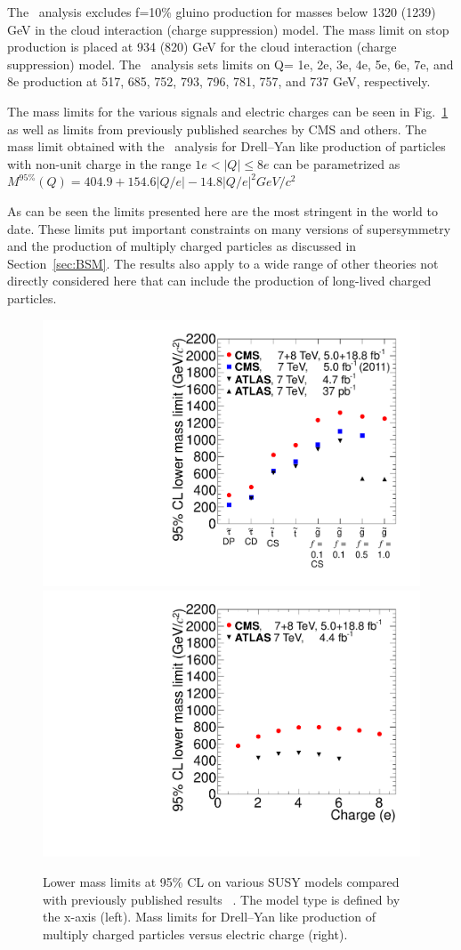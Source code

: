 The \tkonly\ analysis excludes f=10\% gluino production for masses below 1320 (1239) GeV in the cloud interaction (charge suppression) model. 
The mass limit on stop production is placed at 934 (820) GeV for the cloud interaction (charge suppression) model.
The \multi\ analysis sets limits on Q= 1e, 2e, 3e, 4e, 5e, 6e, 7e, and 8e production at 517, 685, 752, 793, 796, 781, 757, and 737 GeV, respectively.

The mass limits for the various signals and electric charges can be seen in Fig.~\ref{fig:masslimits} as well as limits from previously published searches by CMS and others.
The mass limit obtained with the \multi\ analysis for Drell--Yan like production of
particles  with non-unit charge in the range $1e<|Q|\leq8e$ can be parametrized
 as $M^{95\%}(Q) = 404.9 + 154.6 |Q/e| - 14.8 |Q/e|^2 GeV/c^2$

As can be seen the limits presented here are the most stringent in the world to date. These limits put important constraints on many versions of supersymmetry
and the production of multiply charged particles as discussed in Section~\ref{sec:BSM}.
The results also apply to a wide range of other theories not directly considered here that can include the production of long-lived charged particles.

\begin{figure}
 \begin{center}
  \includegraphics[clip=true, trim=0.0cm 0cm 1.0cm 0cm, width=0.44\linewidth]{figures/hscp_resultsNov2012}
  \includegraphics[clip=true, trim=0.0cm 0cm 1.0cm 0cm, width=0.44\linewidth]{figures/DYhscp_resultsNov2012}
 \end{center}
 \caption[Lower mass limits on HSCP produced in various models of new physics compared with previously published results]
{Lower mass limits at 95\% CL on various SUSY models compared with previously published results
~\cite{Aad:2011hz, Aad:2011yf, Aad:2011mb,Aad:2012vd, ATLASmCHAMPs, Khachatryan:2011ts, Chatrchyan:2012sp}. 
The model type is defined by the x-axis (left). 
Mass limits for Drell--Yan like production of multiply charged particles versus electric charge (right).}
   \label{fig:masslimits}
\end{figure}
